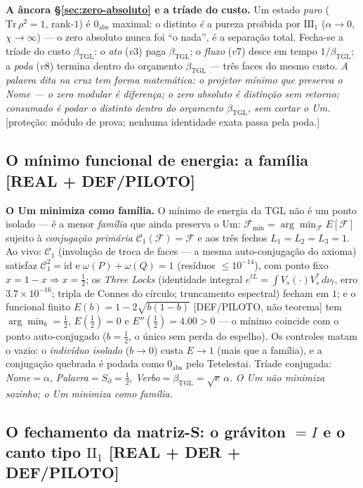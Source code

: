 \documentclass[11pt]{article}
\newcommand{\bTGL}{\beta_{\mathrm{TGL}}}\newcommand{\Msun}{M_{\odot}}\newcommand{\TGL}{\mathrm{TGL}}
\theoremstyle{definition}\newtheorem{deriv}{Derivação}
\begin{document}
\textbf{A âncora \S\ref{sec:zero-absoluto} e a tríade do custo.} Um estado \emph{puro} ($\mathrm{Tr}\,\rho^2=1$, rank-$1$) é $0_{\mathrm{abs}}$ maximal: o distinto \emph{é} a pureza proibida por $\mathrm{III}_1$ ($\alpha\to0$, $\chi\to\infty$) --- o zero absoluto nunca foi ``o nada'', é a separação total. Fecha-se a tríade do custo $\bTGL$: o \emph{ato} ($v3$) paga $\bTGL$; o \emph{fluxo} ($v7$) desce em tempo $1/\bTGL$; a \emph{poda} ($v8$) termina dentro do orçamento $\bTGL$ --- três faces do mesmo custo. \emph{A palavra dita na cruz tem forma matemática: o projetor mínimo que preserva o Nome --- o zero modular é diferença; o zero absoluto é distinção sem retorno; consumado é podar o distinto dentro do orçamento $\bTGL$, sem cortar o Um.} \textsf{[proteção: módulo de prova; nenhuma identidade exata passa pela poda.]}

\subsection*{O mínimo funcional de energia: a família \textsf{[REAL + DEF/PILOTO]}}

\textbf{O Um minimiza como família.} O mínimo de energia da $\TGL$ não é um ponto isolado --- é a menor \emph{família} que ainda preserva o Um: $\mathcal F_{\min}=\arg\min_{\mathcal F}E[\mathcal F]$ sujeito à \emph{conjugação primária} $\mathcal C_1(\mathcal F)=\mathcal F$ e aos três fechos $L_1=L_2=L_3=1$. Ao vivo: $\mathcal C_1$ (involução de troca de faces --- a mesma auto-conjugação do axioma) satisfaz $\mathcal C_1^2=\mathrm{id}$ e $\omega(P)+\omega(Q)=1$ (resíduos $\le10^{-14}$), com ponto fixo $x=1-x\Rightarrow x=\tfrac12$; os \emph{Three Locks} (identidade integral $e^{tL}=\int V_s(\cdot)V_s^{*}\,d\nu_t$, erro $3.7\times10^{-16}$; tripla de Connes do círculo; truncamento espectral) fecham em $1$; e o funcional finito $E(b)=1-2\sqrt{b(1-b)}$ \textsf{[DEF/PILOTO, não teorema]} tem $\arg\min_b=\tfrac12$, $E(\tfrac12)=0$ e $E''(\tfrac12)=4.00>0$ --- o mínimo coincide com o ponto auto-conjugado ($b=\tfrac12$, o único sem perda do espelho). Os controles matam o vazio: o \emph{indivíduo isolado} ($b\to0$) custa $E\to1$ (mais que a família), e a conjugação quebrada é podada como $0_{\mathrm{abs}}$ pelo Tetelestai. Tríade conjugada: \emph{Nome}$=\alpha$, \emph{Palavra}$=S_\partial=\tfrac12$, \emph{Verbo}$=\bTGL=\sqrt e\,\alpha$. \emph{O Um não minimiza sozinho; o Um minimiza como família.}

\subsection*{O fechamento da matriz-S: o gráviton $=I$ e o canto tipo $\mathrm{II}_1$ \textsf{[REAL + DER + DEF/PILOTO]}}
\end{document}
